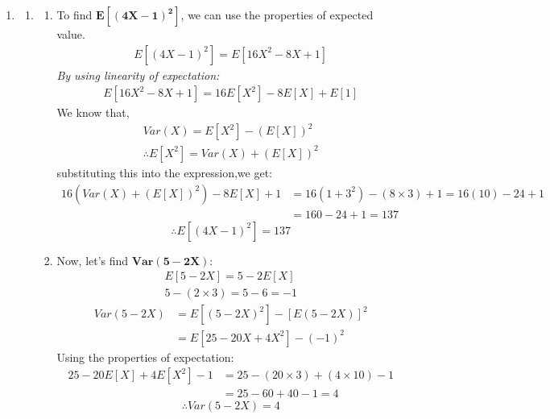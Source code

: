\documentclass{article}
\begin{document}
\begin{enumerate}
\newpage
\item
    \begin{enumerate}
    \item 
        \begin{enumerate}
        \item
            To find \(\mathbf{E[(4X - 1)^2]}\), we can use the properties of expected value.
            \begin{align*}
                E[(4X - 1)^2] = E[16X^2 - 8X + 1]
            \end{align*}
            \textit{By using linearity of expectation:}
            \begin{align*}
                E[16X^2 - 8X + 1] = 16E[X^2] - 8E[X] + E[1]
            \end{align*}
            We know that,
            \begin{align*}
                Var(X) = E[X^2] - (E[X])^2\\
                \therefore E[X^2] = Var(X) + (E[X])^2
            \end{align*}
            substituting this into the expression,we get:
            \begin{align*}
                16(Var(X) + (E[X])^2) - 8E[X] + 1 &= 16(1 + 3^2) - (8 \times 3) + 1 = 16(10) - 24 + 1\\
                &= 160 - 24 + 1 = 137
            \end{align*}
            \[
                \boxed{\therefore E\left[(4X - 1)^2\right] = 137}
            \]
        \item
            Now, let's find \(\mathbf{Var(5 - 2X)}\):
            \begin{align*}
                E[5 - 2X] = 5 - 2E[X]\\
                5 - (2 \times 3) = 5 - 6 = -1
            \end{align*}
            \begin{align*}
                Var(5 - 2X) &= E[(5 - 2X)^2] - [E(5 - 2X)]^2\\
                &= E[25 - 20X + 4X^2] - (-1)^2
            \end{align*}
            Using the properties of expectation:
            \begin{align*}
                25 - 20E[X] + 4E[X^2] - 1 &= 25 - (20 \times 3) + (4 \times 10) - 1
                \\ &= 25 - 60 + 40 - 1 = 4
            \end{align*}
            \[
                \boxed{\therefore Var(5 - 2X) = 4}
\]
\end{enumerate}
\end{enumerate}
\end{enumerate}
\end{document}
